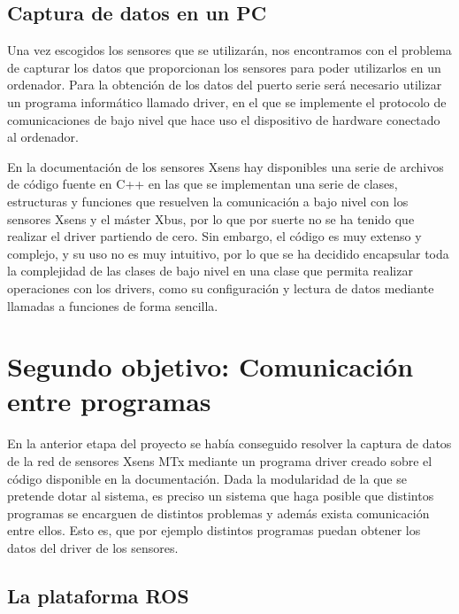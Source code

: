 \documentclass[12pt,a4paper]{article}
\begin{document}
\subsection{Captura de datos en un PC}

Una vez escogidos los sensores que se utilizarán, nos encontramos con el problema de capturar los datos que proporcionan los sensores para poder utilizarlos en un ordenador. Para la obtención de los datos del puerto serie será necesario utilizar un programa informático llamado driver, en el que se implemente el protocolo de comunicaciones de bajo nivel que hace uso el dispositivo de hardware conectado al ordenador.

En la documentación de los sensores Xsens hay disponibles una serie de archivos de código fuente en C++ en las que se implementan una serie de clases, estructuras y funciones que resuelven la comunicación a bajo nivel con los sensores Xsens y el máster Xbus, por lo que por suerte no se ha tenido que realizar el driver partiendo de cero. Sin embargo, el código es muy extenso y complejo, y su uso no es muy intuitivo, por lo que se ha decidido encapsular toda la complejidad de las clases de bajo nivel en una clase que permita realizar operaciones con los drivers, como su configuración y lectura de datos mediante llamadas a funciones de forma sencilla. 

\section{Segundo objetivo: Comunicación entre programas}

En la anterior etapa del proyecto se había conseguido resolver la captura de datos de la red de sensores Xsens MTx mediante un programa driver creado sobre el código disponible en la documentación. Dada la modularidad de la que se pretende dotar al sistema, es preciso un sistema que haga posible que distintos programas se encarguen de distintos problemas y además exista comunicación entre ellos. Esto es, que por ejemplo distintos programas puedan obtener los datos del driver de los sensores.

\subsection{La plataforma ROS}
\end{document}
